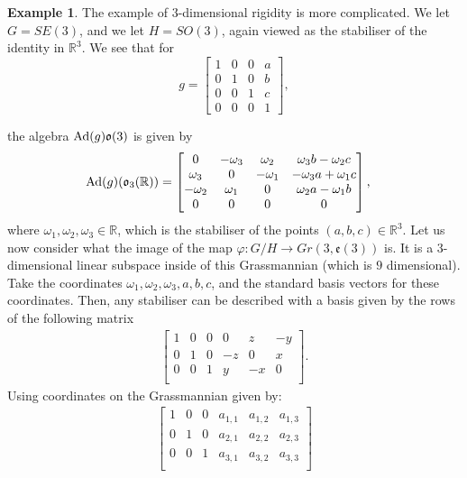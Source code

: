 \documentclass{article}
\theoremstyle{definition}
\newtheorem{example}[theorem]{Example}
\theoremstyle{remark}
\begin{document}
\begin{example}
The example of $3$-dimensional rigidity is more complicated. We let $G=SE(3)$, and we let $H=SO(3)$, again viewed as the stabiliser of the identity in $\mathbb{R}^{3}$. We see that for $$g = \begin{bmatrix}   1 & 0 & 0 & a\\
        0 & 1 & 0 & b\\
        0 & 0 & 1 & c \\
        0 & 0 & 0 & 1
    \end{bmatrix},$$

the algebra $\textup{Ad}(g)\mathfrak{o}(3)$ is given by
\begin{align*}
    \textup{Ad}(g)(\mathfrak{o}_3(\mathbb{R})) &=
    \begin{bmatrix}   0 & -\omega_3 & \omega_2 & \omega_3 b -\omega_2 c\\
        \omega_3 &0  & - \omega_1 & - \omega_3 a +\omega_1 c\\
        - \omega_2& \omega_1 & 0 & \omega_2 a - \omega_1 b \\
        0 & 0 & 0 & 0
    \end{bmatrix},
    \end{align*}
    where $\omega_1, \omega_2, \omega_3\in \mathbb{R}$, which is the stabiliser of the points $(a,b,c)\in \mathbb{R}^{3}$. Let us now consider what the image of the map $\varphi: G/H \rightarrow Gr(3, \mathfrak{e}(3))$ is.  It is a $3$-dimensional linear subspace inside of this Grassmannian (which is $9$ dimensional). Take the coordinates $\omega_1, \omega_2, \omega_3, a, b, c$, and the standard basis vectors for these coordinates. Then, any stabiliser can be described with a basis given by the rows of the following matrix
    \begin{align*}
    \begin{bmatrix}   
    1 & 0 & 0 & 0 & z & - y\\
    0 & 1 & 0 & -z & 0 & x\\
    0 & 0 & 1 & y & -x & 0\\
    \end{bmatrix}.
    \end{align*}
    Using coordinates on the Grassmannian given by:
    \begin{align*}
    \begin{bmatrix}   
    1 & 0 & 0 & a_{1,1} & a_{1,2} & a_{1,3}\\
    0 & 1 & 0 & a_{2,1} & a_{2,2} & a_{2,3}\\
    0 & 0 & 1 & a_{3,1} & a_{3,2} & a_{3,3}\\

\end{bmatrix}
\end{align*}
\end{example}
\end{document}
